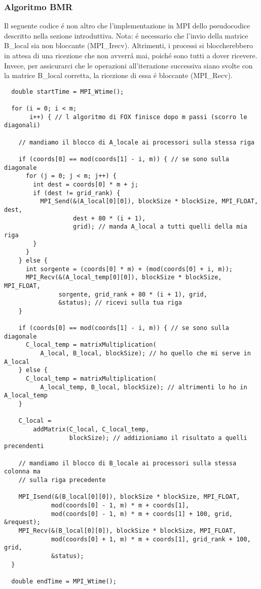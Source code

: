 \subsubsection{Algoritmo BMR}
Il seguente codice é non altro che l'implementazione in MPI dello pseudocodice descritto nella sezione introduttiva. Nota: é necessario che l'invio della matrice B\_local sia non bloccante (MPI\_Irecv). Altrimenti, i processi si bloccherebbero in attesa di una ricezione che non avverrá mai, poiché sono tutti a dover ricevere. Invece, per assicurarci che le operazioni all'iterazione successiva siano svolte con la matrice B\_local corretta, la ricezione di essa é bloccante (MPI\_Recv).
\begin{lstlisting}
  double startTime = MPI_Wtime();

  for (i = 0; i < m;
       i++) { // l algoritmo di FOX finisce dopo m passi (scorro le diagonali)

    // mandiamo il blocco di A_locale ai processori sulla stessa riga

    if (coords[0] == mod(coords[1] - i, m)) { // se sono sulla diagonale
      for (j = 0; j < m; j++) {
        int dest = coords[0] * m + j;
        if (dest != grid_rank) {
          MPI_Send(&(A_local[0][0]), blockSize * blockSize, MPI_FLOAT, dest,
                   dest + 80 * (i + 1),
                   grid); // manda A_local a tutti quelli della mia riga
        }
      }
    } else {
      int sorgente = (coords[0] * m) + (mod(coords[0] + i, m));
      MPI_Recv(&(A_local_temp[0][0]), blockSize * blockSize, MPI_FLOAT,
               sorgente, grid_rank + 80 * (i + 1), grid,
               &status); // ricevi sulla tua riga
    }

    if (coords[0] == mod(coords[1] - i, m)) { // se sono sulla diagonale
      C_local_temp = matrixMultiplication(
          A_local, B_local, blockSize); // ho quello che mi serve in A_local
    } else {
      C_local_temp = matrixMultiplication(
          A_local_temp, B_local, blockSize); // altrimenti lo ho in A_local_temp
    }

    C_local =
        addMatrix(C_local, C_local_temp,
                  blockSize); // addizioniamo il risultato a quelli precendenti

    // mandiamo il blocco di B_locale ai processori sulla stessa colonna ma
    // sulla riga precedente

    MPI_Isend(&(B_local[0][0]), blockSize * blockSize, MPI_FLOAT,
             mod(coords[0] - 1, m) * m + coords[1],
             mod(coords[0] - 1, m) * m + coords[1] + 100, grid, &request);
    MPI_Recv(&(B_local[0][0]), blockSize * blockSize, MPI_FLOAT,
             mod(coords[0] + 1, m) * m + coords[1], grid_rank + 100, grid,
             &status);
  }

  double endTime = MPI_Wtime();
\end{lstlisting}

